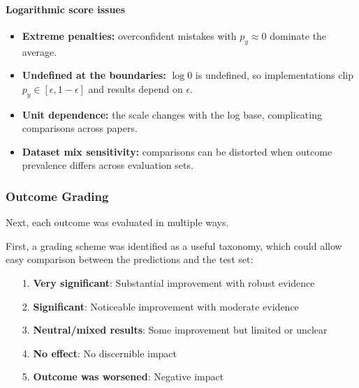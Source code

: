 \documentclass[12pt,a4paper]{article}
\begin{document}

\paragraph{Logarithmic score issues}
\begin{itemize}
\item \textbf{Extreme penalties:} overconfident mistakes with $p_y\!\approx\!0$ dominate the average.
\item \textbf{Undefined at the boundaries:} $\log 0$ is undefined, so implementations clip $p_y\in[\epsilon,1-\epsilon]$ and results depend on $\epsilon$.
\item \textbf{Unit dependence:} the scale changes with the log base, complicating comparisons across papers.
\item \textbf{Dataset mix sensitivity:} comparisons can be distorted when outcome prevalence differs across evaluation sets.
\end{itemize}


\subsubsection{Outcome Grading}
Next, each outcome was evaluated in multiple ways.

First, a grading scheme was identified as a useful taxonomy, which could allow easy comparison between the predictions and the test set:
\begin{itemize}
\item [1.] \textbf{Very significant}: Substantial improvement with robust evidence
\item [2.] \textbf{Significant}: Noticeable improvement with moderate evidence
\item [3.] \textbf{Neutral/mixed results}: Some improvement but limited or unclear
\item [4.] \textbf{No effect}: No discernible impact
\item [5.] \textbf{Outcome was worsened}: Negative impact
\end{itemize}
\end{document}
